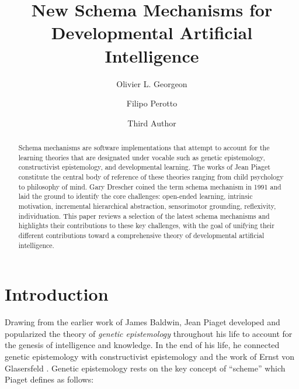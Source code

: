\documentclass[runningheads]{llncs}
\begin{document}
%
\title{New Schema Mechanisms for Developmental Artificial Intelligence}
%
%
\author{Olivier L. Georgeon \and
Filipo Perotto \and
Third Author}
%
%
%
\maketitle              %
%
\begin{abstract}
Schema mechanisms are software implementations that attempt to account for the learning theories that are designated under vocable such as genetic epistemology, constructivist epistemology, and developmental learning.  
The works of Jean Piaget constitute the central body of reference of these theories ranging from child psychology to philosophy of mind.
Gary Drescher coined the term schema mechanism in 1991 and laid the ground to identify the core challenges: open-ended learning, intrinsic motivation, incremental hierarchical abstraction, sensorimotor grounding, reflexivity, individuation. 
This paper reviews a selection of the latest schema mechanisms and highlights their contributions to these key challenges, with the goal of unifying their different contributions toward a comprehensive theory of developmental artificial intelligence.

\end{abstract}
%
%
%
\section{Introduction}


Drawing from the earlier work of James Baldwin, Jean Piaget developed and popularized the theory of \textit{genetic epistemology} \cite{piaget_principles_1997} throughout his life to account for the genesis of intelligence and knowledge. 
In the end of his life, he connected genetic epistemology with constructivist epistemology and the work of Ernst von Glasersfeld \cite{glasersfeld_radical_1997}. 
Genetic epistemology rests on the key concept of ``scheme'' which Piaget defines as follows: 
\\
\end{document}
